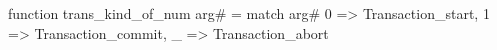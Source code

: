 function trans_kind_of_num arg# = match arg# {
  0 => Transaction_start,
  1 => Transaction_commit,
  _ => Transaction_abort
}
